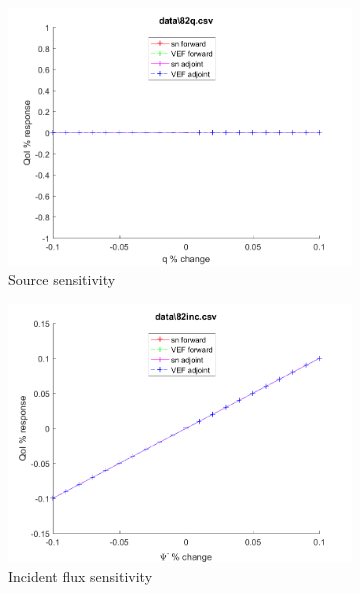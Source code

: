 \documentclass{article}
\begin{document}
\begin{figure}[H]
\label{Case82Sens}
\centering
\begin{subfigure}{.5\textwidth}
  \centering
  \includegraphics[width=.98\linewidth]{IanProposal/figures2/82qSens.png}
  \caption{Source sensitivity}
  \label{fig:sfig1}
\end{subfigure}%
\begin{subfigure}{.5\textwidth}
  \centering
  \includegraphics[width=.98\linewidth]{IanProposal/figures2/82incSens.png}
  \caption{Incident flux sensitivity}
  \label{fig:sfig4}
\end{subfigure}%
\\
\begin{subfigure}{.5\textwidth}
  \centering

\end{subfigure}
\end{figure}
\end{document}
